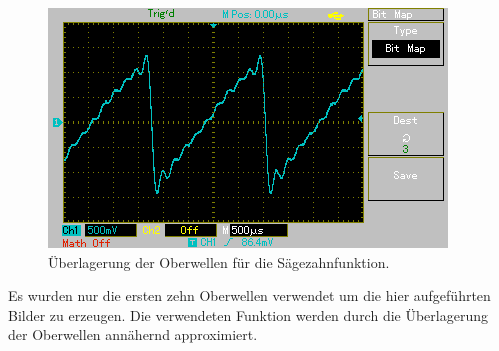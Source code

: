 \begin{figure}[H]
    \centering
    \caption{Überlagerung der Oberwellen für die Sägezahnfunktion.}
    \label{fig:saeg}
    \includegraphics{content/MAP003.png}
\end{figure}
\noindent
Es wurden nur die ersten zehn Oberwellen verwendet um die hier aufgeführten Bilder zu erzeugen.
Die verwendeten Funktion werden durch die Überlagerung der Oberwellen annähernd approximiert.
